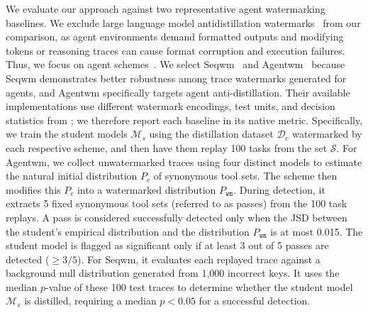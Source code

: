  We evaluate our approach against two representative agent watermarking baselines. We exclude large language model antidistillation watermarks~\cite{xu2026antidistillation,savani2026antidistillation} from our comparison, as agent environments demand formatted outputs and modifying tokens or reasoning traces can cause format corruption and execution failures. Thus, we focus on agent schemes~\cite{an2026sequential,huang2025agent,luo2026agentark}. We select Seqwm~\cite{an2026sequential} and Agentwm~\cite{wang2026protecting} because Seqwm demonstrates better robustness among trace watermarks generated for agents, and Agentwm specifically targets agent anti-distillation. Their available implementations use different watermark encodings, test units, and decision statistics from \name{}; we therefore report each baseline in its native metric. Specifically, we train the student models $\mathcal{M}_s$ using the distillation dataset $\mathcal{D}_c$ watermarked by each respective scheme, and then have them replay 100 tasks from the set $\mathcal{S}$. For Agentwm, we collect unwatermarked traces using four distinct models to estimate the natural initial distribution $P_c$ of synonymous tool sets. The scheme then modifies this $P_c$ into a watermarked distribution $P_{\mathtt{wm}}$. During detection, it extracts 5 fixed synonymous tool sets (referred to as passes) from the 100 task replays. A pass is considered successfully detected only when the JSD between the student's empirical distribution and the distribution $P_{\mathtt{wm}}$ is at most 0.015. The student model is flagged as significant only if at least 3 out of 5 passes are detected ($\geq 3/5$). For Seqwm, it evaluates each replayed trace against a background null distribution generated from 1,000 incorrect keys. It uses the median $p$-value of these 100 test traces to determine whether the student model $\mathcal{M}_s$ is distilled, requiring a median $p < 0.05$ for a successful detection.



